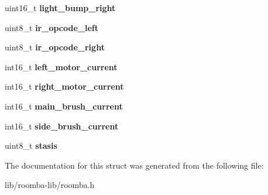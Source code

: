 \begin{DoxyCompactItemize}
\item 
\hypertarget{group__roomba-lib_gab1f0b337b13492bf416a392bdd94bb54}{}uint16\+\_\+t {\bfseries light\+\_\+bump\+\_\+right}\label{group__roomba-lib_gab1f0b337b13492bf416a392bdd94bb54}

\item 
\hypertarget{group__roomba-lib_gacc8eade26f0b95c21fda66fe62cb50a6}{}uint8\+\_\+t {\bfseries ir\+\_\+opcode\+\_\+left}\label{group__roomba-lib_gacc8eade26f0b95c21fda66fe62cb50a6}

\item 
\hypertarget{group__roomba-lib_ga36fd48407b82b248741b666060dcb6df}{}uint8\+\_\+t {\bfseries ir\+\_\+opcode\+\_\+right}\label{group__roomba-lib_ga36fd48407b82b248741b666060dcb6df}

\item 
\hypertarget{group__roomba-lib_gace8a74734805c0951ae53fa3e828f555}{}int16\+\_\+t {\bfseries left\+\_\+motor\+\_\+current}\label{group__roomba-lib_gace8a74734805c0951ae53fa3e828f555}

\item 
\hypertarget{group__roomba-lib_ga3b91ad760130be2525877771cf8fc6ff}{}int16\+\_\+t {\bfseries right\+\_\+motor\+\_\+current}\label{group__roomba-lib_ga3b91ad760130be2525877771cf8fc6ff}

\item 
\hypertarget{group__roomba-lib_gaea3fb7ae386d9504d3acfec6aad3f143}{}int16\+\_\+t {\bfseries main\+\_\+brush\+\_\+current}\label{group__roomba-lib_gaea3fb7ae386d9504d3acfec6aad3f143}

\item 
\hypertarget{group__roomba-lib_ga50e4c322184f845967d69305a6a86c76}{}int16\+\_\+t {\bfseries side\+\_\+brush\+\_\+current}\label{group__roomba-lib_ga50e4c322184f845967d69305a6a86c76}

\item 
\hypertarget{group__roomba-lib_gad676c0f29b774557ad0b4a2164616e5f}{}uint8\+\_\+t {\bfseries stasis}\label{group__roomba-lib_gad676c0f29b774557ad0b4a2164616e5f}

\end{DoxyCompactItemize}


The documentation for this struct was generated from the following file\+:\begin{DoxyCompactItemize}
\item 
lib/roomba-\/lib/roomba.\+h\end{DoxyCompactItemize}
